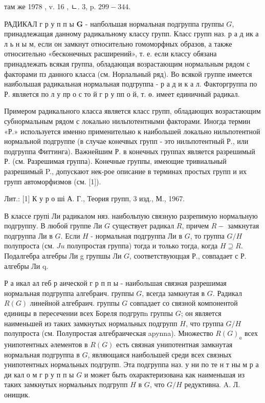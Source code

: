 \documentclass[10pt]{article}
\begin{document}
там же 1978 , v. 16 , ㄴ. 3, p. $299-344$.



РАДИКАЛ г р у п п ы $\mathbf{G}$ - напбольшая нормальная подгруппа группы $G$, принадлежащая данному радикальному классу групп. Класс групп наз. р а д ик а л ь н ы м, если он замкнут относительно гомоморфных образов, а также относительно «бесконечных расширений», т. е. если классу обязана принадлежать всякая группа, обладающая возрастающим нормальным рядом с факторами пз данного класса (см. Норлальный ряд). Во всякой группе имеется наибольшая радикальная нормальная подгруппа - р а д и к а л. Факторгруппа по Р. является по л у пр о с то й г р у пп о й, т. ө. имеет единичный радикал.



Примером радикального класса является класс групп, обладающих возрастающим субнормальным рядом с локально нильпотентными факторами. Иногда термин «Р.» используется именно применительно к наибольшей локально нильпотентной нормальной подгруппе (в случае конечвых групп - это нильпотентный Р., или подгруппа Фиттинга). Важнейшим Р. в конечных группах является разрешимый Р. (см. Разрешимая группа). Конечные группы, имеющие тривиальный разрешимый P., допускают нек-рое описание в терминах простых групп и их групп автоморфизмов (см. [1]).



Лит.: [1] К у р о ші А. Г., Теория групп, 3 изд., М., 1967.



В классе групі Ли радикалом няз. наибольпую связную разрепимую нормальную подгруппу. В любой группе Ли $G$ существует радикал $R$, причем $R-$ замкнутая подгруппа Ли в $G$. Если $H$ - нормальная подгруппа Ли в $G$, то группа $G / H$ полупроста (см. $J u$ полупростая группа) тогда и только тогда, когда $H \supseteq R$. Подалгебра алгебры Ли g групшы Ли $G$, соответствуюццая Р., совпадает с Р. алгебры Ли q.



Р а икал ал геб р аической г р п п ы - наибольшая связная разрешимая нормальная подгруппа алгебраич. группы $G$, всегда замкнутая в $G$. Радикал $R(G)$ линейной алгебраич. группы $G$ совпадает со связной компонентой единицы в пересечении всех Бореля подгрупn группы $G$; он является наименьшей из таких замкнутых нормальных подгрупп $H$, что группа $G / H$ полупроста (см. Полупростая алгебраическая apynna). Множество $R(G)_{a}$ всех унипотентных әлементов в $R(G)$ есть связная унипотентная замкнутая нормальная подгруппа в $G$, являющаяся наибольшей среди всех связных унипотентных нормальных подгрупп. Эта подгруппа наз. у ни по те н т ны м р а ди кал о м г р у п п ы $G$ и может быть охарактеризована как наименьшая из таких замкнутых нормальных подгрупп $H$ в $G$, что $G / H$ редуктивна. A. Л. онищик.
\end{document}

